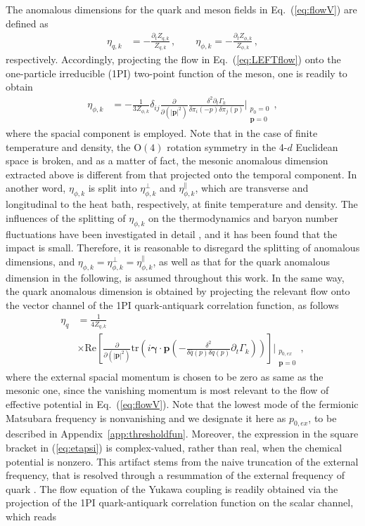 \documentclass[%
reprint,
superscriptaddress,
showpacs,preprintnumbers,
 amsmath,amssymb,
 aps,
prd,
]{revtex4-1}
\def\Eq#1{Eq.~(\ref{#1})}
\def\eq#1{(\ref{#1})}
\def\app#1{Appendix~\ref{#1}}
\begin{document}
The anomalous dimensions for the quark and meson fields in \Eq{eq:flowV} are defined as
%
\begin{align}
 \eta_{q,k}&=-\frac{\partial_t Z_{q,k}}{Z_{q,k}}\,,\qquad
  \eta_{\phi,k}=-\frac{\partial_t Z_{\phi,k}}{Z_{\phi,k}}\,,
\end{align}
%
respectively. Accordingly, projecting the flow in \Eq{eq:LEFTflow} onto the one-particle irreducible (1PI) two-point function of the meson, one is readily to obtain 
%
\begin{align}
  \eta_{\phi,k}&=-\frac{1}{3Z_{\phi,k}}\delta_{ij}\frac{\partial}{\partial (|\bm{p}|^2)}\frac{\delta^2 \partial_t \Gamma_k}{\delta \pi_i(-p) \delta \pi_j(p)}\Bigg|_{\substack{p_0=0\\ \bm{p}=0}}\,,\label{eq:etaphi}
\end{align}
%
where the spacial component is employed. Note that in the case of finite temperature and density, the $\mathrm{O}(4)$ rotation symmetry in the 4-$d$ Euclidean space is broken, and as a matter of fact, the mesonic anomalous dimension extracted above is different from that projected onto the temporal component. In another word, $\eta_{\phi,k}$ is split into $\eta_{\phi,k}^{\perp}$ and $\eta_{\phi,k}^{\parallel}$, which are transverse and longitudinal to the heat bath, respectively, at finite temperature and density. The influences of the splitting of $\eta_{\phi,k}$ on the thermodynamics and baryon number fluctuations have been investigated in detail \cite{Yin:2019ebz}, and it has been found that the impact is small. Therefore, it is reasonable to disregard the splitting of anomalous dimensions, and $\eta_{\phi,k}=\eta_{\phi,k}^{\perp}=\eta_{\phi,k}^{\parallel}$, as well as that for the quark anomalous dimension in the following, is assumed throughout this work. In the same way, the quark anomalous dimension is obtained by projecting the relevant flow onto the vector channel of the 1PI quark-antiquark correlation function, as follows
%
\begin{align}
  \eta_{q}&=\frac{1}{4 Z_{q,k}}\nonumber\\[2ex]
&\times\mathrm{Re}\left[\frac{\partial}{\partial (|\bm{p}|^2)}\mathrm{tr}
            \left(i \bm{\gamma}\cdot\bm{p}\left(-\frac{\delta^2}{\delta\bar{q}(p)
            \delta q(p)}\partial_t \Gamma_k\right)\right)\right]\Bigg|_{\substack{p_{0,ex}\\ \bm{p}=0}}\,,  \label{eq:etapsi}
\end{align}
%
where the external spacial momentum is chosen to be zero as same as the mesonic one, since the vanishing momentum is most relevant to the flow of effective potential in \Eq{eq:flowV}. Note that the lowest mode of the fermionic Matsubara frequency is nonvanishing and we designate it here as $p_{0,ex}$, to be described in \app{app:thresholdfun}. Moreover, the expression in the square bracket in \eq{eq:etapsi} is complex-valued, rather than real, when the chemical potential is nonzero. This artifact stems from the naive truncation of the external frequency, that is resolved through a resummation of the external frequency of quark  \cite{Fu:2016tey}. The flow equation of the Yukawa coupling is readily obtained via the projection of the 1PI quark-antiquark correlation function on the scalar channel, which reads
\end{document}
